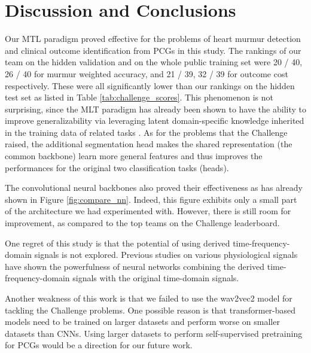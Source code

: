 \section{Discussion and Conclusions}
\label{sec:discu}

Our MTL paradigm proved effective for the problems of heart murmur detection and clinical outcome identification from PCGs in this study. The rankings of our team on the hidden validation and on the whole public training set were 20 / 40, 26 / 40 for murmur weighted accuracy, and 21 / 39, 32 / 39 for outcome cost respectively. These were all significantly lower than our rankings on the hidden test set as listed in Table \ref{tab:challenge_scores}. This phenomenon is not surprising, since the MLT paradigm has already been shown to have the ability to improve generalizability via leveraging latent domain-specific knowledge inherited in the training data of related tasks \cite{Caruana_1997_mtl}. As for the problems that the Challenge raised, the additional segmentation head makes the shared representation (the common backbone) learn more general features and thus improves the performances for the original two classification tasks (heads).

The convolutional neural backbones also proved their effectiveness as has already shown in Figure \ref{fig:compare_nn}. Indeed, this figure exhibits only a small part of the architecture we had experimented with. However, there is still room for improvement, as compared to the top teams on the Challenge leaderboard.

One regret of this study is that the potential of using derived time-frequency-domain signals is not explored. Previous studies on various physiological signals have shown the powerfulness of neural networks combining the derived time-frequency-domain signals with the original time-domain signals.

Another weakness of this work is that we failed to use the wav2vec2 model for tackling the Challenge problems. One possible reason is that transformer-based models need to be trained on larger datasets and perform worse on smaller datasets than CNNs. Using larger datasets to perform self-supervised pretraining for PCGs would be a direction for our future work.
